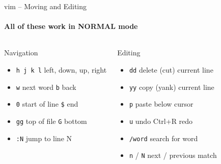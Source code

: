 \documentclass[aspectratio=169]{beamer}
\begin{document}
\begin{frame}{vim -- Moving and Editing}
  \framesubtitle{All of these work in NORMAL mode}
  \begin{columns}
      \begin{block}{Navigation}
        \begin{itemize}
          \item \texttt{h j k l} \quad left, down, up, right
          \item \texttt{w} \quad next word \quad \texttt{b} \quad back
          \item \texttt{0} \quad start of line \quad \texttt{\$} \quad end
          \item \texttt{gg} \quad top of file \quad \texttt{G} \quad bottom
          \item \texttt{:N} \quad jump to line N
        \end{itemize}
      \end{block}
      \begin{block}{Editing}
        \begin{itemize}
          \item \texttt{dd} \quad delete (cut) current line
          \item \texttt{yy} \quad copy (yank) current line
          \item \texttt{p} \quad paste below cursor
          \item \texttt{u} \quad undo \quad Ctrl+R \quad redo
          \item \texttt{/word} \quad search for word
          \item \texttt{n} / \texttt{N} \quad next / previous match
        \end{itemize}
      \end{block}
  \end{columns}
\end{frame}
\end{document}
